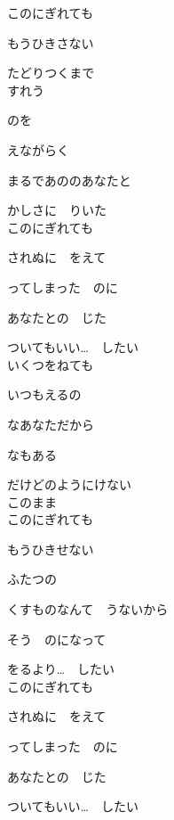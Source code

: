 \large{

このにぎれても

もうひきさない

たどりつくまで
\\

すれう

のを

えながらく

まるであののあなたと

かしさに　りいた
\\

このにぎれても

されぬに　をえて

ってしまった　のに

あなたとの　じた

ついてもいい…　したい
\\

いくつをねても

いつもえるの

なあなただから

なもある

だけどのようにけない
\\

このまま
\\

このにぎれても

もうひきせない

ふたつの

くすものなんて　うないから

そう　のになって

をるより…　したい
\\

このにぎれても

されぬに　をえて

ってしまった　のに

あなたとの　じた

ついてもいい…　したい

}